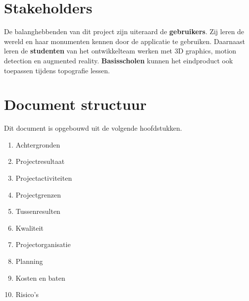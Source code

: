 \section{Stakeholders} \label{sec:stakeholders}
De balanghebbenden van dit project zijn uiteraard de \textbf{gebruikers}. Zij leren de wereld en haar monumenten kennen door de applicatie te gebruiken. Daarnaast leren de \textbf{studenten} van het ontwikkelteam werken met 3D graphics, motion detection en augmented reality. \textbf{Basisscholen} kunnen het eindproduct ook toepassen tijdens topografie lessen.

\section{Document structuur} \label{sec:structure}
Dit document is opgebouwd uit de volgende hoofdstukken.
\begin{enumerate}
	\item Achtergronden
	\item Projectresultaat
	\item Projectactiviteiten
	\item Projectgrenzen
	\item Tussenresulten
	\item Kwaliteit
	\item Projectorganisatie
	\item Planning
	\item Kosten en baten
	\item Risico's
\end{enumerate}